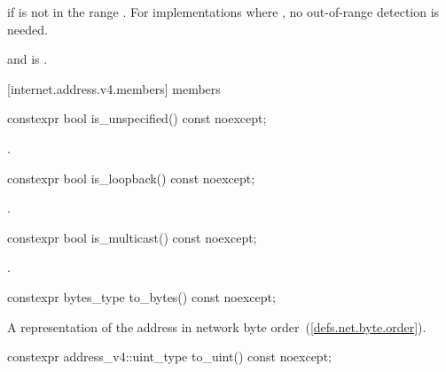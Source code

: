 \begin{itemdescr}
\pnum
\remarks {} if  is not in the range \tcode{[0, 0xFFFFFFFF]}. \enternote For implementations where , no out-of-range detection is needed. \exitnote

\pnum
\postconditions {} and  is .
\end{itemdescr}



[internet.address.v4.members]{ members}

\begin{itemdecl}
constexpr bool is_unspecified() const noexcept;
\end{itemdecl}

\begin{itemdescr}
\pnum
\returns {}.
\end{itemdescr}

\begin{itemdecl}
constexpr bool is_loopback() const noexcept;
\end{itemdecl}

\begin{itemdescr}
\pnum
\returns {}.
\end{itemdescr}

\begin{itemdecl}
constexpr bool is_multicast() const noexcept;
\end{itemdecl}

\begin{itemdescr}
\pnum
\returns {}.
\end{itemdescr}

\begin{itemdecl}
constexpr bytes_type to_bytes() const noexcept;
\end{itemdecl}

\begin{itemdescr}
\pnum
\returns A representation of the address in network byte order~(\ref{defs.net.byte.order}).
\end{itemdescr}

\begin{itemdecl}
constexpr address_v4::uint_type to_uint() const noexcept;
\end{itemdecl}

